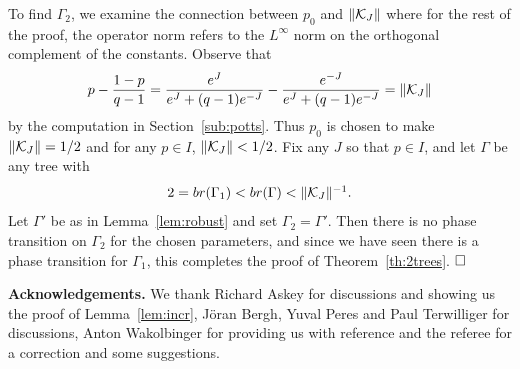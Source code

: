 To find $\Gamma_2$, we examine the connection between $p_0$ and 
$\| {\cal K}_J \|$ where for the rest of the proof, the operator norm
refers to the $L^\infty$ norm on the orthogonal complement of the constants. 
Observe that
$$p - {1-p \over q-1} = {e^J \over e^J + (q-1) e^{-J}} - {e^{-J} \over
   e^J + (q-1) e^{-J}} = \| {\cal K}_J \|$$
by the computation in Section~\ref{sub:potts}.  Thus $p_0$ is
chosen to make $\| {\cal K}_J \| = 1/2$ and for any $p \in I$, $\| {\cal K}_J \| < 1/2$.
Fix any $J$ so that $p \in I$, and let $\Gamma$ be any tree with 
$$2 = \textstyle {br}  (\Gamma_1) < 
\textstyle {br}  (\Gamma) < \| {\cal K}_J \|^{-1}.$$  
Let $\Gamma'$ be as in Lemma~\ref{lem:robust} and set $\Gamma_2 = \Gamma'$.  
Then there is no phase transition on $\Gamma_2$ for the chosen parameters,
and since we have seen there is a phase transition for $\Gamma_1$,
this completes the proof of Theorem~\ref{th:2trees}.  $\qed$

\noindent
{\bf Acknowledgements.}
We thank Richard Askey for discussions and showing us the proof of
Lemma~\ref{lem:incr}, J\"{o}ran Bergh, Yuval Peres
and Paul Terwilliger for discussions, Anton Wakolbinger
for providing us with reference \cite{E} and the referee for a correction
and some suggestions.

